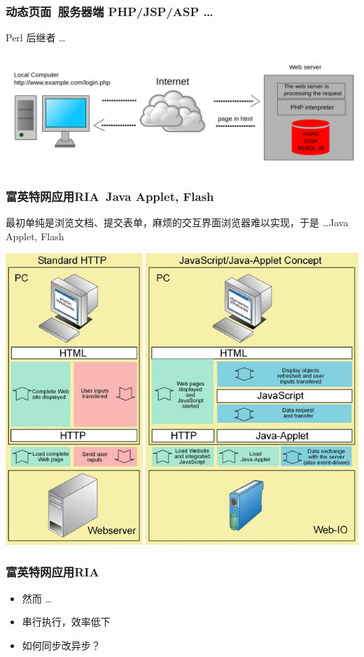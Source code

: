 \documentclass{beamer}
\begin{document}
\begin{frame}
	\frametitle{动态页面~{\smal 服务器端 PHP/JSP/ASP \dots}}
	Perl 后继者 \dots \\
	\begin{center}
	\includegraphics[width=\textwidth]{images/2000px-Scheme_dynamic_page_en.svg.png}
	\end{center}
\end{frame}

\begin{frame}
	\frametitle{富英特网应用RIA~{\small Java Applet, Flash}}
	最初单纯是浏览文档、提交表单，麻烦的交互界面浏览器难以实现，于是 \dots Java Applet, Flash\\
	\begin{center}
	\includegraphics[width=\textwidth]{images/java-applet.jpg}
	\end{center}
\end{frame}

\begin{frame}
	\frametitle{富英特网应用RIA}
	\beamertemplatetransparentcovereddynamicmedium
	\begin{itemize}[<+->]
		\item 然而 \dots
		\item 串行执行，效率低下
		\item 如何同步改异步？
	\end{itemize}
\end{frame}
\end{document}
